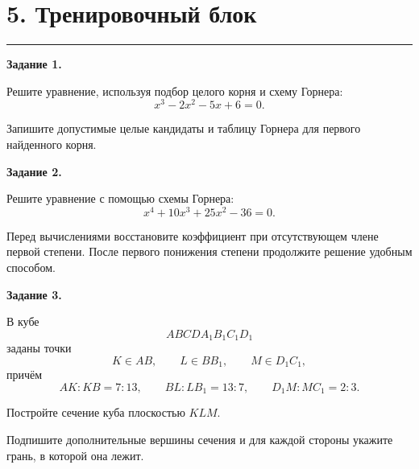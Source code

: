 \documentclass[a4paper,12pt]{article}
\newcommand{\sectionline}{%
  \vspace{-0.35em}\par\noindent
  \textcolor{accent!55}{\rule{\linewidth}{0.45pt}}\vspace{0.35em}
}
\begin{document}
\clearpage

\section*{5. Тренировочный блок}
\sectionline

\textbf{Задание 1.}

Решите уравнение,
используя подбор целого корня
и схему Горнера:
\[
x^3-2x^2-5x+6=0.
\]

Запишите допустимые целые кандидаты
и таблицу Горнера
для первого найденного корня.

\vspace{6mm}

\textbf{Задание 2.}

Решите уравнение
с помощью схемы Горнера:
\[
x^4+10x^3+25x^2-36=0.
\]

Перед вычислениями восстановите коэффициент
при отсутствующем члене первой степени.
После первого понижения степени
продолжите решение удобным способом.

\vspace{6mm}

\textbf{Задание 3.}

В кубе
\[
ABCDA_1B_1C_1D_1
\]
заданы точки
\[
K\in AB,
\qquad
L\in BB_1,
\qquad
M\in D_1C_1,
\]
причём
\[
AK:KB=7:13,
\qquad
BL:LB_1=13:7,
\qquad
D_1M:MC_1=2:3.
\]

Постройте сечение куба
плоскостью $KLM$.

Подпишите дополнительные вершины сечения
и для каждой стороны укажите грань,
в которой она лежит.

\begin{center}
\end{center}
\end{document}
